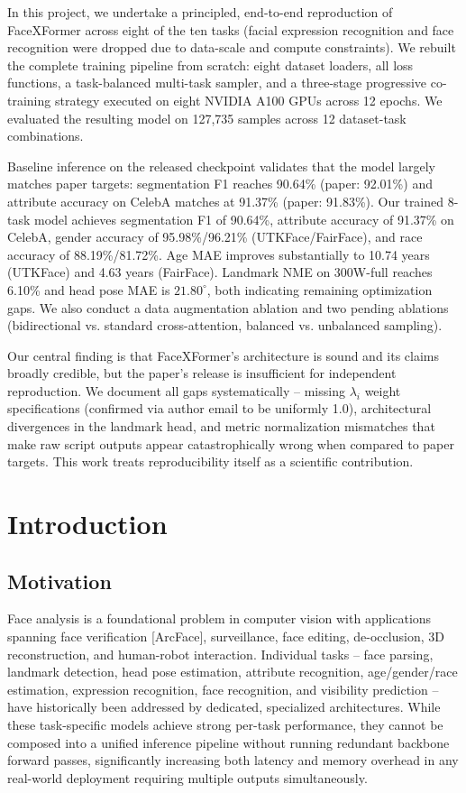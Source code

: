 \documentclass[11pt]{article}
\begin{document}
In this project, we undertake a principled, end-to-end reproduction of FaceXFormer across eight of the ten tasks (facial expression recognition and face recognition were dropped due to data-scale and compute constraints). We rebuilt the complete training pipeline from scratch: eight dataset loaders, all loss functions, a task-balanced multi-task sampler, and a three-stage progressive co-training strategy executed on eight NVIDIA A100 GPUs across 12 epochs. We evaluated the resulting model on 127,735 samples across 12 dataset-task combinations.

Baseline inference on the released checkpoint validates that the model largely matches paper targets: segmentation F1 reaches 90.64\% (paper: 92.01\%) and attribute accuracy on CelebA matches at 91.37\% (paper: 91.83\%). Our trained 8-task model achieves segmentation F1 of 90.64\%, attribute accuracy of 91.37\% on CelebA, gender accuracy of 95.98\%/96.21\% (UTKFace/FairFace), and race accuracy of 88.19\%/81.72\%. Age MAE improves substantially to 10.74 years (UTKFace) and 4.63 years (FairFace). Landmark NME on 300W-full reaches 6.10\% and head pose MAE is $21.80^\circ$, both indicating remaining optimization gaps. We also conduct a data augmentation ablation and two pending ablations (bidirectional vs. standard cross-attention, balanced vs. unbalanced sampling).

Our central finding is that FaceXFormer's architecture is sound and its claims broadly credible, but the paper's release is insufficient for independent reproduction. We document all gaps systematically -- missing $\lambda_i$ weight specifications (confirmed via author email to be uniformly 1.0), architectural divergences in the landmark head, and metric normalization mismatches that make raw script outputs appear catastrophically wrong when compared to paper targets. This work treats reproducibility itself as a scientific contribution.



\section{Introduction}



\subsection{Motivation}

Face analysis is a foundational problem in computer vision with applications spanning face verification [ArcFace], surveillance, face editing, de-occlusion, 3D reconstruction, and human-robot interaction. Individual tasks -- face parsing, landmark detection, head pose estimation, attribute recognition, age/gender/race estimation, expression recognition, face recognition, and visibility prediction -- have historically been addressed by dedicated, specialized architectures. While these task-specific models achieve strong per-task performance, they cannot be composed into a unified inference pipeline without running redundant backbone forward passes, significantly increasing both latency and memory overhead in any real-world deployment requiring multiple outputs simultaneously.
\end{document}
